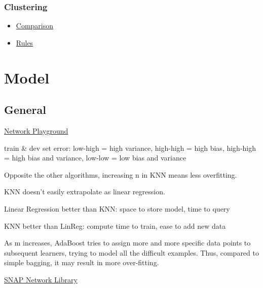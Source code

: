 \documentclass[]{book}
\begin{document}
\subsection{Clustering}\label{clustering}

\begin{itemize}
\item
  \href{http://scikit-learn.org/stable/modules/clustering.html\#clustering}{Comparison}
\item
  \href{https://twitter.com/thomaswdinsmore/status/965223193043718145}{Rules}
\end{itemize}

\chapter{Model}\label{model-1}

\section{General}\label{general-5}

\href{https://mikedombo.github.io/graphPlayground/\#}{Network
Playground}

train \& dev set error: low-high = high variance, high-high = high bias,
high-high = high bias and variance, low-low = low bias and variance

Opposite the other algorithms, increasing n in KNN means less
overfitting.

KNN doesn't easily extrapolate as linear regression.

Linear Regression better than KNN: space to store model, time to query

KNN better than LinReg: compute time to train, ease to add new data

As m increases, AdaBoost tries to assign more and more specific data
points to subsequent learners, trying to model all the difficult
examples. Thus, compared to simple bagging, it may result in more
over-fitting.

\href{https://snap.stanford.edu/snappy/index.html}{SNAP Network Library}
\end{document}
